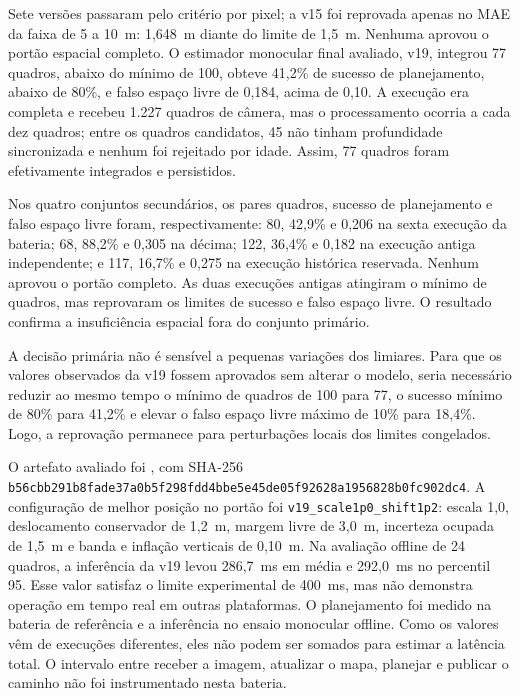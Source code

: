 Sete versões passaram pelo critério por pixel; a v15 foi reprovada apenas no MAE da faixa de 5 a 10~m: 1,648~m diante do limite de 1,5~m. Nenhuma aprovou o portão espacial completo. O estimador monocular final avaliado, v19, integrou 77 quadros, abaixo do mínimo de 100, obteve 41,2\% de sucesso de planejamento, abaixo de 80\%, e falso espaço livre de 0,184, acima de 0,10. A execução era completa e recebeu 1.227 quadros de câmera, mas o processamento ocorria a cada dez quadros; entre os quadros candidatos, 45 não tinham profundidade sincronizada e nenhum foi rejeitado por idade. Assim, 77 quadros foram efetivamente integrados e persistidos.

Nos quatro conjuntos secundários, os pares quadros, sucesso de planejamento e falso espaço livre foram, respectivamente: 80, 42,9\% e 0,206 na sexta execução da bateria; 68, 88,2\% e 0,305 na décima; 122, 36,4\% e 0,182 na execução antiga independente; e 117, 16,7\% e 0,275 na execução histórica reservada. Nenhum aprovou o portão completo. As duas execuções antigas atingiram o mínimo de quadros, mas reprovaram os limites de sucesso e falso espaço livre. O resultado confirma a insuficiência espacial fora do conjunto primário.

A decisão primária não é sensível a pequenas variações dos limiares. Para que os valores observados da v19 fossem aprovados sem alterar o modelo, seria necessário reduzir ao mesmo tempo o mínimo de quadros de 100 para 77, o sucesso mínimo de 80\% para 41,2\% e elevar o falso espaço livre máximo de 10\% para 18,4\%. Logo, a reprovação permanece para perturbações locais dos limites congelados.

O artefato avaliado foi , com SHA-256 \texttt{b56cbb291b8fade37a0b5f298fdd4bbe5e45de05f92628a1956828b0fc902dc4}. A configuração de melhor posição no portão foi \texttt{v19\_scale1p0\_shift1p2}: escala 1,0, deslocamento conservador de 1,2~m, margem livre de 3,0~m, incerteza ocupada de 1,5~m e banda e inflação verticais de 0,10~m. Na avaliação offline de 24 quadros, a inferência da v19 levou 286,7~ms em média e 292,0~ms no percentil 95. Esse valor satisfaz o limite experimental de 400~ms, mas não demonstra operação em tempo real em outras plataformas. O planejamento foi medido na bateria de referência e a inferência no ensaio monocular offline. Como os valores vêm de execuções diferentes, eles não podem ser somados para estimar a latência total. O intervalo entre receber a imagem, atualizar o mapa, planejar e publicar o caminho não foi instrumentado nesta bateria.

